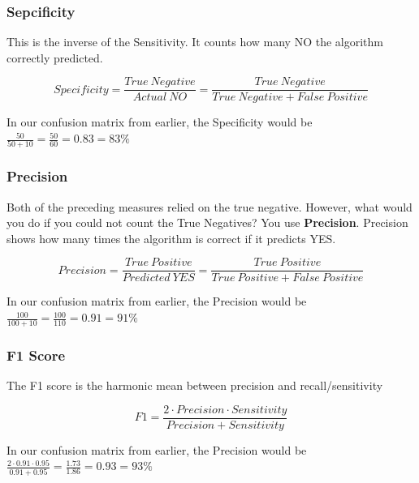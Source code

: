 \documentclass[11pt]{article}
\begin{document}
\subsubsection{Sepcificity}
This is the inverse of the Sensitivity. It counts how many NO the algorithm correctly predicted.

\begin{equation}
    Specificity= \frac{True\ Negative}{Actual\ NO} = \frac{True\ Negative}{True\ Negative + False\ Positive}
\end{equation}

\vspace{10px}

In our confusion matrix from earlier, the Specificity would be $\frac{50}{50+ 10} = \frac{50}{60} = 0.83 = 83\%$

\subsubsection{Precision}
Both of the preceding measures relied on the true negative. However, what would you do if you could not count the True Negatives? You use \textbf{Precision}. Precision shows how many times the algorithm is correct if it predicts YES.

\begin{equation}
    Precision = \frac{True\ Positive}{Predicted\ YES} = \frac{True\ Positive}{True\ Positive + False\ Positive}
\end{equation}

\vspace{10px}

In our confusion matrix from earlier, the Precision would be $\frac{100}{100+ 10} = \frac{100}{110} = 0.91 = 91\%$

\subsubsection{F1 Score}

The F1 score is the harmonic mean between precision and recall/sensitivity

\begin{equation}
    F1 = \frac{2 \cdot Precision \cdot Sensitivity}{Precision + Sensitivity}
\end{equation}

In our confusion matrix from earlier, the Precision would be $\frac{2 \cdot 0.91 \cdot 0.95}{0.91 + 0.95} = \frac{1.73}{1.86} = 0.93 = 93\%$

\vspace{10px}
\end{document}
